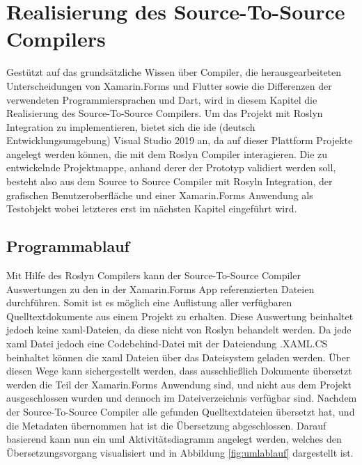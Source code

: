 \chapter{Realisierung des Source-To-Source Compilers}
\label{chap:Realisierung}
Gestützt auf das grundsätzliche Wissen über Compiler, die herausgearbeiteten Unterscheidungen von  Xamarin.Forms und Flutter sowie die Differenzen der verwendeten Programmiersprachen  \Csharp und Dart, wird in diesem Kapitel die Realisierung des Source-To-Source Compilers. Um das Projekt mit Roslyn Integration zu implementieren,  bietet sich die \ac{ide} (deutsch Entwicklungsumgebung) Visual Studio 2019 an, da auf dieser Plattform Projekte angelegt werden können, die mit dem Roslyn Compiler interagieren. Die zu entwickelnde Projektmappe, anhand derer der Prototyp validiert werden soll, besteht also aus dem Source to Source Compiler mit Rosyln Integration, der grafischen Benutzeroberfläche und einer Xamarin.Forms Anwendung als Testobjekt wobei letzteres erst im nächsten Kapitel eingeführt wird. 



\section{Programmablauf}
Mit Hilfe des Roslyn Compilers kann der Source-To-Source Compiler Auswertungen zu den in der Xamarin.Forms App referenzierten Dateien durchführen.  Somit ist es möglich eine Auflistung aller verfügbaren Quelltextdokumente aus einem Projekt zu erhalten.  Diese Auswertung beinhaltet jedoch keine \ac{xaml}-Dateien,  da diese nicht von Roslyn behandelt werden.  Da jede \ac{xaml} Datei jedoch eine Codebehind-Datei mit der Dateiendung .XAML.CS beinhaltet können die  \ac{xaml} Dateien über das Dateisystem geladen werden.  Über diesen Wege kann sichergestellt werden, dass ausschließlich Dokumente übersetzt werden die Teil der Xamarin.Forms Anwendung sind, und nicht aus dem Projekt ausgeschlossen wurden und dennoch im Dateiverzeichnis verfügbar sind.  Nachdem der Source-To-Source Compiler alle gefunden Quelltextdateien übersetzt hat, und die Metadaten übernommen hat ist die Übersetzung  abgeschlossen.  Darauf basierend kann nun ein \ac{uml} Aktivitätsdiagramm angelegt werden,  welches den Übersetzungsvorgang visualisiert und in Abbildung \ref{fig:umlablauf} dargestellt ist.  

